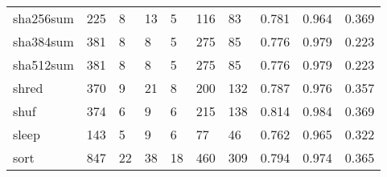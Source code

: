 \begin{longtable}{lp{1.3cm}p{1.3cm}p{1.3cm}p{1.3cm}p{1.3cm}p{1.3cm}p{1.3cm}p{1.3cm}p{1.3cm}}
sha256sum &                    225 &                                  8 &                                13 &                                5 &                               116 &                              83 &                                   0.781 &                                  0.964 &                                0.369 \\
sha384sum &                    381 &                                  8 &                                 8 &                                5 &                               275 &                              85 &                                   0.776 &                                  0.979 &                                0.223 \\
sha512sum &                    381 &                                  8 &                                 8 &                                5 &                               275 &                              85 &                                   0.776 &                                  0.979 &                                0.223 \\
shred     &                    370 &                                  9 &                                21 &                                8 &                               200 &                             132 &                                   0.787 &                                  0.976 &                                0.357 \\
shuf      &                    374 &                                  6 &                                 9 &                                6 &                               215 &                             138 &                                   0.814 &                                  0.984 &                                0.369 \\
sleep     &                    143 &                                  5 &                                 9 &                                6 &                                77 &                              46 &                                   0.762 &                                  0.965 &                                0.322 \\
sort      &                    847 &                                 22 &                                38 &                               18 &                               460 &                             309 &                                   0.794 &                                  0.974 &                                0.365 \\

\end{longtable}
